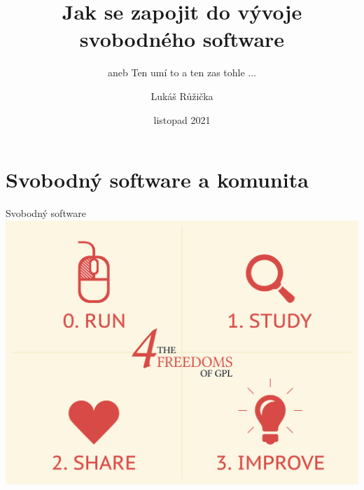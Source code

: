 \documentclass[11pt]{beamer}
\begin{document}
	\author{Lukáš Růžička}
	\title{Jak se zapojit do vývoje svobodného software}
	\subtitle{aneb Ten umí to a ten zas tohle ...}
	\date{listopad 2021}
	\begin{frame}[plain]
		\maketitle
	\end{frame}

\section{Svobodný software a komunita}

 	\begin{frame}{Svobodný software}		
		\includegraphics[width=\textwidth]{images/fs_rights.png}
 	\end{frame}
 
\end{document}
